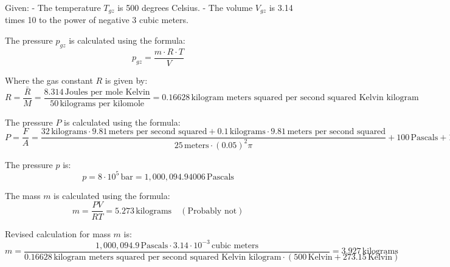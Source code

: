 Given:
- The temperature \( T_{gz} \) is 500 degrees Celsius.
- The volume \( V_{gz} \) is 3.14 times 10 to the power of negative 3 cubic meters.

The pressure \( p_{gz} \) is calculated using the formula:
\[ p_{gz} = \frac{m \cdot R \cdot T}{V} \]

Where the gas constant \( R \) is given by:
\[ R = \frac{\bar{R}}{M} = \frac{8.314 \, \text{Joules per mole Kelvin}}{50 \, \text{kilograms per kilomole}} = 0.16628 \, \text{kilogram meters squared per second squared Kelvin kilogram} \]

The pressure \( P \) is calculated using the formula:
\[ P = \frac{F}{A} = \frac{32 \, \text{kilograms} \cdot 9.81 \, \text{meters per second squared} + 0.1 \, \text{kilograms} \cdot 9.81 \, \text{meters per second squared}}{25 \, \text{meters} \cdot (0.05)^2 \pi} + 100 \, \text{Pascals} + 1 \, \text{bar} + 10^5 \, \text{Pascals} \]

The pressure \( p \) is:
\[ p = 8 \cdot 10^5 \, \text{bar} = 1,000,094.94006 \, \text{Pascals} \]

The mass \( m \) is calculated using the formula:
\[ m = \frac{PV}{RT} = 5.273 \, \text{kilograms} \quad (\text{Probably not}) \]

Revised calculation for mass \( m \) is:
\[ m = \frac{1,000,094.9 \, \text{Pascals} \cdot 3.14 \cdot 10^{-3} \, \text{cubic meters}}{0.16628 \, \text{kilogram meters squared per second squared Kelvin kilogram} \cdot (500 \, \text{Kelvin} + 273.15 \, \text{Kelvin})} = 3.927 \, \text{kilograms} \]
